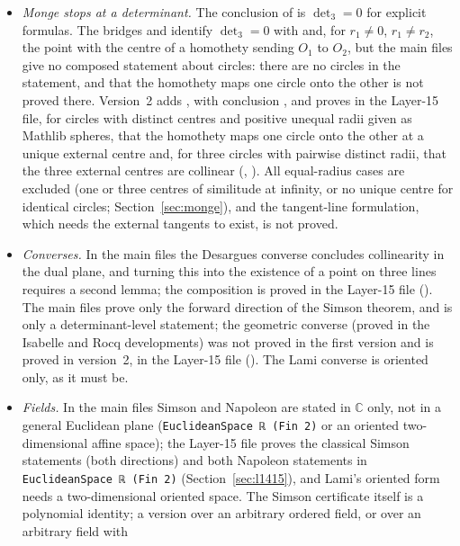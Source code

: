 \documentclass[11pt]{article}
\theoremstyle{definition}
\theoremstyle{remark}
\newcommand{\lean}[1]{\texttt{#1}}
\newcommand{\CC}{\mathbb{C}}
\begin{document}
\begin{itemize}
\item \emph{Monge stops at a determinant.} The conclusion of  is $\det_3=0$ for
explicit formulas. The bridges  and
 identify $\det_3=0$ with  and, for
$r_1\ne0$, $r_1\ne r_2$, the point  with the centre of a homothety sending $O_1$
to $O_2$, but the main files give no composed statement about circles: there are no circles in the
statement, and that the homothety maps one circle onto the other is not proved there. Version~2 adds
, with conclusion , and proves in the Layer-15 file, for
circles with distinct centres and positive unequal radii given as Mathlib spheres, that the
homothety maps one circle onto the other at a unique external centre and, for three circles with
pairwise distinct radii, that the three external centres are collinear
(, ). All equal-radius cases are
excluded (one or three centres of similitude at infinity, or no unique centre for identical
circles; Section~\ref{sec:monge}), and the tangent-line formulation, which needs the external
tangents to exist, is not proved.
\item \emph{Converses.} In the main files the Desargues converse concludes collinearity in the dual
plane, and turning this into the existence of a point on three lines requires a second lemma; the
composition is proved in the Layer-15 file (). The main files
prove only the forward direction of the Simson theorem, and
 is only a determinant-level statement; the geometric
converse (proved in the Isabelle and Rocq developments) was not proved in the first version and is
proved in version~2, in the Layer-15 file (). The Lami converse is oriented only, as it must be.
\item \emph{Fields.} In the main files Simson and Napoleon are stated in $\CC$ only, not in a general Euclidean
plane (\lean{EuclideanSpace ℝ (Fin 2)} or an oriented two-dimensional affine space); the Layer-15
file proves the classical Simson statements (both directions) and both Napoleon statements in
\lean{EuclideanSpace ℝ (Fin 2)} (Section~\ref{sec:l1415}), and Lami's
oriented form needs a two-dimensional oriented space. The Simson certificate itself is a
polynomial identity; a version over an arbitrary ordered field, or over an arbitrary field with

\end{itemize}
\end{document}
